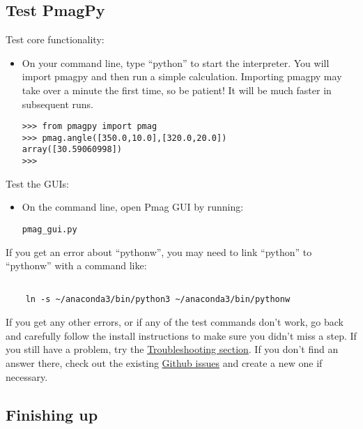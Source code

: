 \documentclass[11pt]{article}
\begin{document}
\subsection{Test PmagPy}


Test core functionality:

\begin{itemize}
  \item On your command line, type ``python'' to start the interpreter.  You will import pmagpy and then run a simple calculation.  Importing pmagpy may take over a minute the first time, so be patient!  It will be much faster in subsequent runs.

\begin{verbatim}
>>> from pmagpy import pmag
>>> pmag.angle([350.0,10.0],[320.0,20.0])
array([30.59060998])
>>>
\end{verbatim}

\end{itemize}

Test the GUIs:

\begin{itemize}
\item  On the command line, open Pmag GUI by running:

\begin{verbatim}
pmag_gui.py
\end{verbatim}

\end{itemize}

If you get an error about ``pythonw'', you may need to link ``python'' to ``pythonw'' with a command like:

  \begin{verbatim}

    ln -s ~/anaconda3/bin/python3 ~/anaconda3/bin/pythonw

    \end{verbatim}

If you get any other errors, or if any of the test commands don't work, go back and carefully follow the install instructions to make sure you didn't miss a step.  If you still have a problem, try the \href{https://earthref.org/PmagPy/cookbook/#trouble}{Troubleshooting section}.  If you don't find an answer there, check out the existing \href{https://github.com/PmagPy/PmagPy/issues}{Github issues} and create a new one if necessary.

\subsection{Finishing up}
\end{document}
